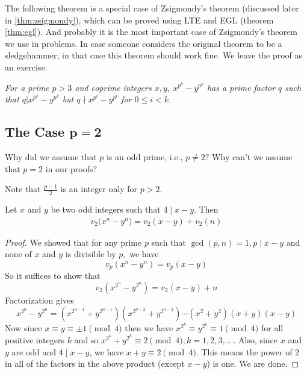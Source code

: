 \documentclass[main.tex]{subfile}
\begin{document}
    The following theorem is a  special case of Zsigmondy's theorem (discussed later in \eqref{thm:zsigmondy}), which can be proved using LTE and EGL (theorem \eqref{thm:egl}). And probably it is the most important case of Zsigmondy's theorem  we use in problems. In case someone considers the original theorem to be a sledgehammer, in that case this theorem should work fine. We leave the proof as an exercise.

    \begin{theorem}\slshape
    	For a prime $p>3$ and coprime integers $x,y$, $x^{p^k}-y^{p^k}$ has a prime factor $q$ such that $q|x^{p^k}-y^{p^k}$ but $q\nmid x^{p^i}-y^{p^i}$ for $0\le i<k$.
    \end{theorem}


\subsection{The Case \texorpdfstring{$\boldsymbol{p=2}$}{p = 2}}

    \begin{question}
        Why did we assume that $p$ is an odd prime, i.e., $p \neq 2 ?$ Why can't we assume that $p=2$ in our proofs?
    \end{question}

    \begin{hint}
        Note that $\frac{p-1}{2}$ is an integer only for $p>2.$
    \end{hint}


    \begin{theorem}[LTE for $p = 2$]
        Let $x$ and $y$ be two odd integers such that $4 \mid x-y.$ Then
         \begin{align*}
         	v_2  \big(x^n - y^n \big) = v_2  (x-y ) + v_2  (n )
         \end{align*}
    \end{theorem}

    \begin{proof}
        We showed that for any prime $p$ such that $\gcd(p,n)=1, p \mid x-y$ and  none of $x$ and $y$ is divisible by $p,$ we have
            \[v_p(  x^n - y^n ) = v_p(  x - y )\]
        So it suffices to show that
            \[v_2(  x^{2^{n}} - y^{2^{n}} ) = v_2(  x-y ) + n\]
        Factorization gives
            \[x^{2^{n}} - y^{2^{n}} = (x^{2^{n-1}} + y^{2^{n-1}})(x^{2^{n-2}} + y^{2^{n-2}}) \cdots (x^2 + y^2 )(x + y)(x - y) \]
        Now since $x \equiv y \equiv \pm 1\pmod 4$ then we have $x^{2^{k}}  \equiv  y^{2^{k}} \equiv 1 \pmod 4$ for all positive integers $k$ and so $x^{2^{k}} + y^{2^{k}} \equiv 2 \pmod 4, k=1,2,3,\ldots.$ Also, since $x$ and $y$ are odd and $4\mid x-y$, we have $x+y \equiv 2\pmod 4$.
        This means the power of $2$ in all of the factors in the above product (except $x-y$) is one. We are done.
    \end{proof}
\end{document}
